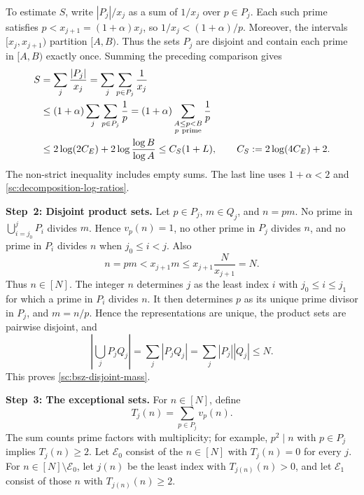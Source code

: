 \documentclass[twoside]{aomart}
\makeatletter
\theoremstyle{paperplain}
\theoremstyle{paperdefinition}
\renewenvironment{proof}[1][\proofname]{\par\pushQED{\qed}%
  \normalfont\topsep6\p@\@plus3\p@\relax\trivlist
  \item[\hskip\labelsep\itshape #1\@addpunct{.}]\ignorespaces
}{\popQED\endtrivlist\@endpefalse}
\numberwithin{equation}{section}
\makeatother
\begin{document}
\begin{proof}
To estimate $S$, write $|P_j|/x_j$ as a sum of $1/x_j$
over $p\in P_j$. Each such prime satisfies
$p<x_{j+1}=(1+\alpha)x_j$, so $1/x_j<(1+\alpha)/p$.
Moreover, the intervals $[x_j,x_{j+1})$ partition $[A,B)$.
Thus the sets $P_j$ are disjoint and contain each prime in
$[A,B)$ exactly once. Summing the preceding comparison gives
\begin{align}
 S&=\sum_j\frac{|P_j|}{x_j}
   =\sum_j\sum_{p\in P_j}\frac1{x_j}\notag\\
 &\le(1+\alpha)\sum_j\sum_{p\in P_j}\frac1p
   =(1+\alpha)\sum_{\substack{A\le p<B\\p\ \mathrm{prime}}}\frac1p\notag\\
 &\le2\log(2C_E)+2\log\frac{\log B}{\log A}
   \le C_S(1+L),\qquad C_S:=2\log(4C_E)+2.
 \label{sc:bsz-block-total}
\end{align}
The non-strict inequality includes empty sums. The last line uses
$1+\alpha<2$ and \eqref{sc:decomposition-log-ratios}.

\par
\medskip
\noindent\textbf{Step~2: Disjoint product sets.}
Let $p\in P_j$, $m\in Q_j$, and $n=pm$.
No prime in $\bigcup_{i=j_0}^jP_i$ divides $m$.
Hence $v_p(n)=1$, no other prime in $P_j$ divides $n$,
and no prime in $P_i$ divides $n$ when $j_0\le i<j$.
Also
\begin{equation*}
 n=pm<x_{j+1}m\le x_{j+1}\frac{N}{x_{j+1}}=N.
 \end{equation*}
Thus $n\in[N]$. The integer $n$ determines $j$ as the least
index $i$ with $j_0\le i\le j_1$ for which a prime in $P_i$
divides $n$. It then determines $p$ as its unique prime divisor
in $P_j$, and $m=n/p$. Hence the representations are unique,
the product sets are pairwise disjoint, and
\begin{equation*}
 \left|\bigcup_jP_jQ_j\right|
 =\sum_j|P_jQ_j|=\sum_j|P_j||Q_j|\le N.
 \end{equation*}
This proves \eqref{sc:bsz-disjoint-mass}.

\par
\medskip
\noindent\textbf{Step~3: The exceptional sets.}
For $n\in[N]$, define
\begin{equation*}
 T_j(n)=\sum_{p\in P_j}v_p(n).
 \end{equation*}
The sum counts prime factors with multiplicity; for example,
$p^2\mid n$ with $p\in P_j$ implies $T_j(n)\ge2$.
Let $\mathcal E_0$ consist of the $n\in[N]$ with $T_j(n)=0$
for every $j$. For $n\in[N]\setminus\mathcal E_0$, let $j(n)$
be the least index with $T_{j(n)}(n)>0$, and let
$\mathcal E_1$ consist of those $n$ with $T_{j(n)}(n)\ge2$.


\end{proof}
\end{document}
